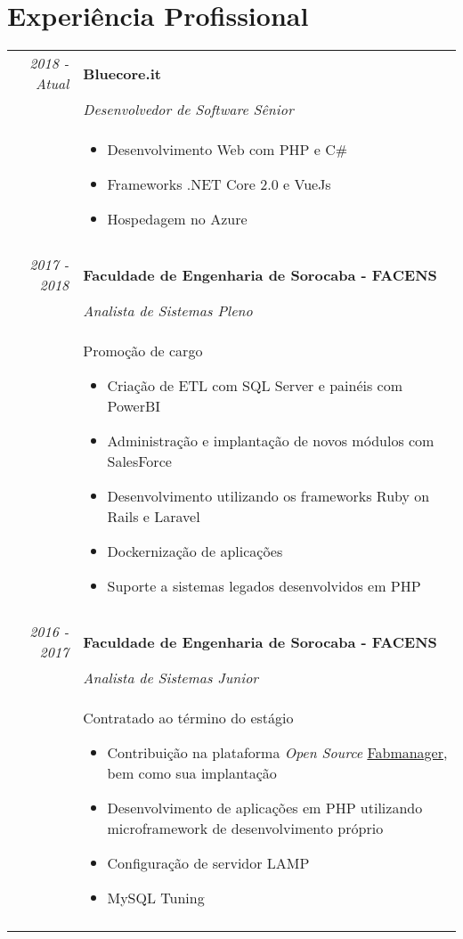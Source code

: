 \documentclass[a4paper,10pt]{article}
\begin{document}
\section{Experiência Profissional}
\begin{tabular}{r|p{11cm}}
 \emph{2018 - Atual} & \textbf{Bluecore.it} \\
 & \emph{\textit{Desenvolvedor de Software Sênior}} \\
 & \footnotesize{ 
 \begin{itemize}
 	\item Desenvolvimento Web com PHP e C\#
 	\item Frameworks .NET Core 2.0 e VueJs
 	\item Hospedagem no Azure
 \end{itemize} } \\ \multicolumn{2}{c}{} \\

 \emph{2017 - 2018} & \textbf{Faculdade de Engenharia de Sorocaba - FACENS} \\
 & \emph{\textit{Analista de Sistemas Pleno}} \\
 & \footnotesize{Promoção de cargo 
 \begin{itemize}
 	\item Criação de ETL com SQL Server e painéis com PowerBI
 	\item Administração e implantação de novos módulos com SalesForce
 	\item Desenvolvimento utilizando os frameworks Ruby on Rails e Laravel
 	\item Dockernização de aplicações
 	\item Suporte a sistemas legados desenvolvidos em PHP
 \end{itemize} } \\ \multicolumn{2}{c}{} \\

 \emph{2016 - 2017} & \textbf{Faculdade de Engenharia de Sorocaba - FACENS} \\
 & \emph{\textit{Analista de Sistemas Junior}} \\
 & \footnotesize{Contratado ao término do estágio
 \begin{itemize}
 	\item Contribuição na plataforma \textit{Open Source} \href{https://github.com/LaCasemate/fab-manager} {Fabmanager}, bem como sua implantação
 	\item Desenvolvimento de aplicações em PHP utilizando microframework de desenvolvimento próprio
 	\item Configuração de servidor LAMP
 	\item MySQL Tuning
 \end{itemize} } \\ \multicolumn{2}{c}{} \\
 

\end{tabular}
\end{document}
